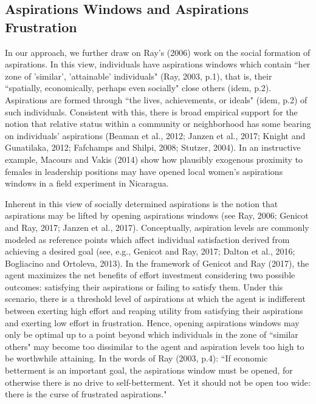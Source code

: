 \documentclass[11.5pt]{article}
\begin{document}
\subsection{Aspirations Windows and Aspirations Frustration}

In our approach, we further draw on Ray's (2006) work on the social formation of aspirations. In this view, individuals have aspirations windows which contain ``her zone of 'similar', 'attainable' individuals" (Ray, 2003, p.1), that is, their ``spatially, economically, perhaps even socially" close others (idem, p.2). Aspirations are formed through ``the lives, achievements, or ideals" (idem, p.2) of such individuals. Consistent with this, there is broad empirical support for the notion that relative status within a community or neighborhood has some bearing on individuals' aspirations (Beaman et al., 2012; Janzen et al., 2017; Knight and Gunatilaka, 2012; Fafchamps and Shilpi, 2008; Stutzer, 2004). In an instructive example, Macours and Vakis (2014) show how plausibly exogenous proximity to females in leadership positions may have opened local women's aspirations windows in a field experiment in Nicaragua.

Inherent in this view of socially determined aspirations is the notion that aspirations may be lifted by opening aspirations windows (see Ray, 2006; Genicot and Ray, 2017; Janzen et al., 2017). Conceptually, aspiration levels are commonly modeled as reference points which affect individual satisfaction derived from achieving a desired goal (see, e.g., Genicot and Ray, 2017; Dalton et al., 2016; Bogliacino and Ortoleva, 2013). In the framework of Genicot and Ray (2017), the agent maximizes the net benefits of effort investment considering two possible outcomes: satisfying their aspirations or failing to satisfy them. Under this scenario, there is a threshold level of aspirations at which the agent is indifferent between exerting high effort and reaping utility from satisfying their aspirations and exerting low effort in frustration. Hence, opening aspirations windows may only be optimal up to a point beyond which individuals in the zone of ``similar others" may become too dissimilar to the agent and aspiration levels too high to be worthwhile attaining. In the words of Ray (2003, p.4): ``If economic betterment is an important goal, the aspirations window must be opened, for otherwise there is no drive to self-betterment. Yet it should not be open too wide: there is the curse of frustrated aspirations."
\end{document}
